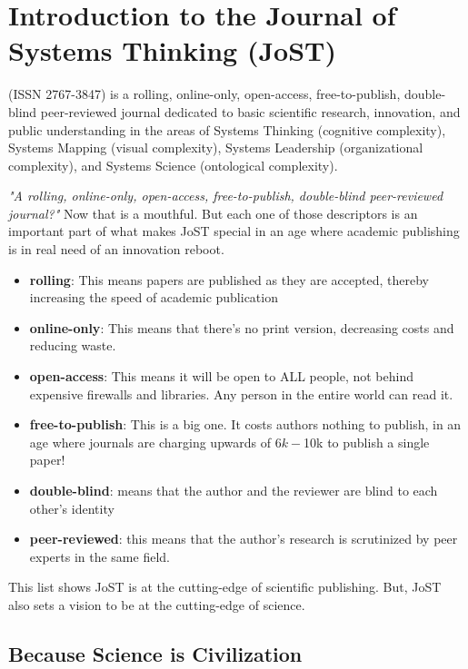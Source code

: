 \documentclass{tufte-handout}
\begin{document}
\section{Introduction to the Journal of Systems Thinking (JoST)}\label{sec:Introduction}

 (ISSN 2767-3847) is a rolling, online-only, open-access, free-to-publish, double-blind peer-reviewed journal dedicated to basic scientific research, innovation, and public understanding in the areas of Systems Thinking (cognitive complexity), Systems Mapping (visual complexity), Systems Leadership (organizational complexity), and Systems Science (ontological complexity). 

\textit{"A rolling, online-only, open-access, free-to-publish, double-blind peer-reviewed journal?"} Now that is a mouthful. But each one of those descriptors is an important part of what makes JoST special in an age where academic publishing is in real need of an innovation reboot.
\begin{itemize}
    \item \textbf{rolling}: This means papers are published as they are accepted, thereby increasing the speed of academic publication
    \item \textbf{online-only}: This means that there's no print version, decreasing costs and reducing waste.
    \item \textbf{open-access}: This means it will be open to ALL people, not behind expensive firewalls and libraries. Any person in the entire world can read it.
    \item \textbf{free-to-publish}: This is a big one. It costs authors nothing to publish, in an age where journals are charging upwards of $6k-$10k to publish a single paper!
    \item \textbf{double-blind}: means that the author and the reviewer are blind to each other's identity 
    \item \textbf{peer-reviewed}: this means that the author's research is scrutinized by peer experts in the same field.
\end{itemize}

This list shows JoST is at the cutting-edge of scientific publishing. But, JoST also sets a vision to be at the cutting-edge of science. 

\subsection{Because Science is Civilization} \label{sec:Science is Civilization}
\end{document}
